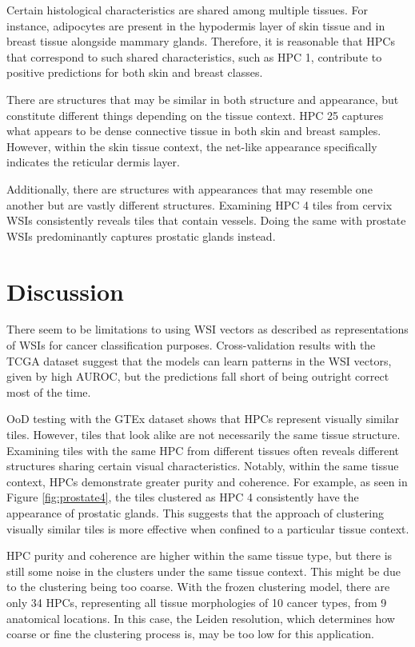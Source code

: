 \documentclass{l4proj}
\begin{document}
Certain histological characteristics are shared among multiple tissues. For instance, adipocytes are present in the hypodermis layer of skin tissue and in breast tissue alongside mammary glands. Therefore, it is reasonable that HPCs that correspond to such shared characteristics, such as HPC 1, contribute to positive predictions for both skin and breast classes.

There are structures that may be similar in both structure and appearance, but constitute different things depending on the tissue context. HPC 25 captures what appears to be dense connective tissue in both skin and breast samples. However, within the skin tissue context, the net-like appearance specifically indicates the reticular dermis layer.

Additionally, there are structures with appearances that may resemble one another but are vastly different structures. Examining HPC 4 tiles from cervix WSIs consistently reveals tiles that contain vessels. Doing the same with prostate WSIs predominantly captures prostatic glands instead. 

\section{Discussion} \label{sec:discuss-classifier}
There seem to be limitations to using WSI vectors as described as representations of WSIs for cancer classification purposes. Cross-validation results with the TCGA dataset suggest that the models can learn patterns in the WSI vectors, given by high AUROC, but the predictions fall short of being outright correct most of the time. 

OoD testing with the GTEx dataset shows that HPCs represent visually similar tiles. However, tiles that look alike are not necessarily the same tissue structure. Examining tiles with the same HPC from different tissues often reveals different structures sharing certain visual characteristics. Notably, within the same tissue context, HPCs demonstrate greater purity and coherence. For example, as seen in Figure \ref{fig:prostate4}, the tiles clustered as HPC 4 consistently have the appearance of prostatic glands. This suggests that the approach of clustering visually similar tiles is more effective when confined to a particular tissue context.

HPC purity and coherence are higher within the same tissue type, but there is still some noise in the clusters under the same tissue context. This might be due to the clustering being too coarse. With the frozen clustering model, there are only 34 HPCs, representing all tissue morphologies of 10 cancer types, from 9 anatomical locations. In this case, the Leiden resolution, which determines how coarse or fine the clustering process is, may be too low for this application.
\end{document}
